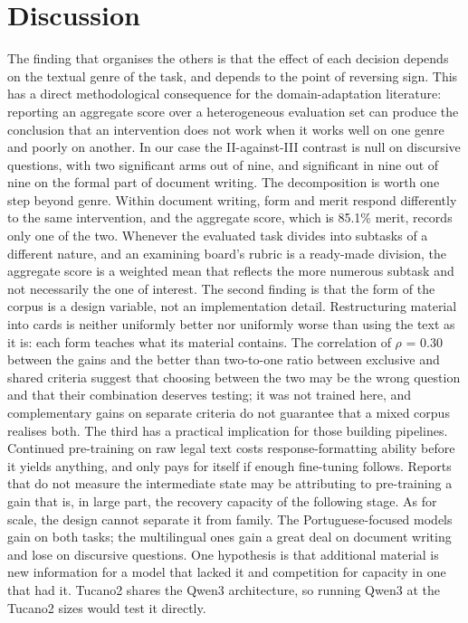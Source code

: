 \documentclass{IOS-Book-Article}
\begin{document}
\section{Discussion}
The finding that organises the others is that the effect of each decision depends on the textual genre of the task, and depends to the point of reversing sign. This has a direct methodological consequence for the domain-adaptation literature: reporting an aggregate score over a heterogeneous evaluation set can produce the conclusion that an intervention does not work when it works well on one genre and poorly on another. In our case the II-against-III contrast is null on discursive questions, with two significant arms out of nine, and significant in nine out of nine on the formal part of document writing.
The decomposition is worth one step beyond genre. Within document writing, form and merit respond differently to the same intervention, and the aggregate score, which is 85.1\% merit, records only one of the two. Whenever the evaluated task divides into subtasks of a different nature, and an examining board's rubric is a ready-made division, the aggregate score is a weighted mean that reflects the more numerous subtask and not necessarily the one of interest.
The second finding is that the form of the corpus is a design variable, not an implementation detail. Restructuring material into cards is neither uniformly better nor uniformly worse than using the text as it is: each form teaches what its material contains. The correlation of $\rho$ = 0.30 between the gains and the better than two-to-one ratio between exclusive and shared criteria suggest that choosing between the two may be the wrong question and that their combination deserves testing; it was not trained here, and complementary gains on separate criteria do not guarantee that a mixed corpus realises both.
The third has a practical implication for those building pipelines. Continued pre-training on raw legal text costs response-formatting ability before it yields anything, and only pays for itself if enough fine-tuning follows. Reports that do not measure the intermediate state may be attributing to pre-training a gain that is, in large part, the recovery capacity of the following stage.
As for scale, the design cannot separate it from family. The Portuguese-focused models gain on both tasks; the multilingual ones gain a great deal on document writing and lose on discursive questions. One hypothesis is that additional material is new information for a model that lacked it and competition for capacity in one that had it. Tucano2 shares the Qwen3 architecture, so running Qwen3 at the Tucano2 sizes would test it directly.
\end{document}
